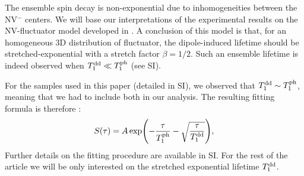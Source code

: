 \documentclass[preprintnumbers,amsmath,amssymb,superscriptaddress,twocolumn,showpacs]{revtex4-2}
\begin{document}
The ensemble spin decay is non-exponential due to inhomogeneities between the NV$^-$ centers. We will base our interpretations of the experimental results on the NV-fluctuator model developed in \citep{choi_depolarization_2017}. A conclusion of this model is that, for an homogeneous 3D distribution of fluctuator, the dipole-induced lifetime should be stretched-exponential with a stretch factor $\beta=1/2$. Such an ensemble lifetime is indeed observed when $T_1^{\rm dd} \ll T_1^{\rm ph}$  (see SI).

For the samples used in this paper (detailed in SI), we observed that $T_1^{\rm dd} \sim T_1^{\rm ph}$, meaning that we had to include both  in our analysis. The resulting fitting formula is therefore :
\begin{equation}
S(\tau)=A \exp (-\frac{\tau}{T_1^{\rm ph}} -\sqrt{\frac{\tau}{T_1^{\rm dd}}}),
\end{equation}
Further details on the fitting procedure are available in SI. For the rest of the article we will be only interested on the stretched exponential lifetime ${T_1^{\rm dd}}$.

\end{document}
